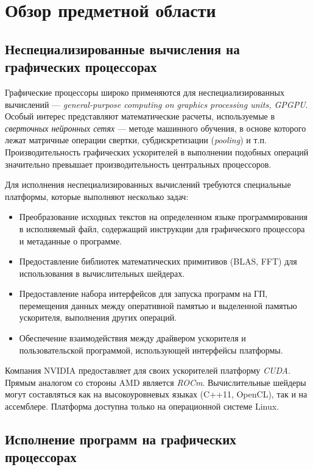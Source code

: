 \documentclass[a4paper,14pt]{extarticle}
\newenvironment{ul}{\begin{itemize}[noitemsep,topsep=0em]}{\end{itemize}\vspace{4mm}}
\begin{document}
\section{Обзор предметной области}

\subsection{Неспециализированные вычисления на графических процессорах}

Графические процессоры широко применяются для неспециализированных вычислений —
\textit{general-purpose computing on graphics processing units, GPGPU}.
Особый интерес представляют математические расчеты, используемые в
\textit{сверточных нейронных сетях} — методе машинного обучения, в основе которого
лежат матричные операции свертки, субдискретизации (\textit{pooling}) и т.п.
Производительность графических ускорителей в выполнении подобных операций
значительно превышает производительность центральных процессоров.

Для исполнения неспециализированных вычислений требуются специальные платформы,
которые выполняют несколько задач:
\begin{ul}
\item Преобразование исходных текстов на определенном языке программирования
  в исполняемый файл, содержащий инструкции для графического процессора и метаданные о программе.
\item Предоставление библиотек математических примитивов (BLAS, FFT)
  для использования в вычислительных шейдерах.
\item Предоставление набора интерфейсов для запуска программ на ГП, перемещения данных между
  оперативной памятью и выделенной памятью ускорителя, выполнения других операций.
\item Обеспечение взаимодействия между драйвером ускорителя и пользовательской программой,
  использующей интерфейсы платформы.
\end{ul}

Компания NVIDIA предоставляет для своих ускорителей платформу \textit{CUDA}. Прямым аналогом
со стороны AMD является \textit{ROCm}. Вычислительные шейдеры могут составляться как
на высокоуровневых языках (C++11, OpenCL), так и на ассемблере. Платформа доступна
только на операционной системе Linux.

\subsection{Исполнение программ на графических процессорах}
\end{document}
